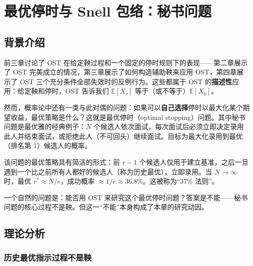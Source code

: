 \section{最优停时与 Snell 包络：秘书问题}

\subsection{背景介绍}

前三章讨论了 OST 在给定鞅过程和一个固定的停时规则下的表现——第二章展示了 OST 完美成立的情况，第三章展示了如何构造辅助鞅来应用 OST，第四章展示了 OST 三个充分条件全部失效时的反例行为。这些都属于 OST 的\textbf{描述性}应用：给定鞅和停时，OST 告诉我们 $\mathbb{E}[X_\tau]$ 等于（或不等于）$\mathbb{E}[X_0]$。

然而，概率论中还有一类与此对偶的问题：如果可以\textbf{自己选择}停时以最大化某个期望收益，最优策略是什么？这就是最优停时（optimal stopping）问题。其中秘书问题是最优雅的经典例子\cite{ferguson1989secretary,gilbert1966recognizing}：$N$ 个候选人依次面试，每次面试后必须立即决定录用此人并结束面试，或拒绝此人（不可回头）继续面试。目标为最大化录用到最优（排名第 1）候选人的概率。

该问题的最优策略具有简洁的形式：前 $r-1$ 个候选人仅用于建立基准，之后一旦遇到一个比之前所有人都好的候选人（称为历史最优），立即录用。当 $N \to \infty$ 时，最优 $r^* \approx N/e$，成功概率 $\approx 1/e \approx 36.8\%$。这被称为``37\% 法则''\cite{ferguson1989secretary}。

一个自然的问题是：能否用 OST 来研究这个最优停时问题？答案是不能——秘书问题的核心过程不是鞅。但这一``不能''本身构成了本章的研究动因。

\subsection{理论分析}

\subsubsection{历史最优指示过程不是鞅}

